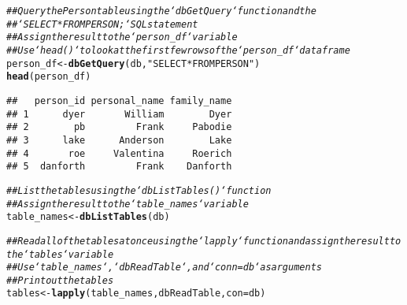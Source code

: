 \documentclass{article}\usepackage[]{graphicx}\usepackage[]{xcolor}
\makeatletter
\newcommand{\hlstr}[1]{\textcolor[rgb]{0.192,0.494,0.8}{#1}}%
\newcommand{\hlcom}[1]{\textcolor[rgb]{0.678,0.584,0.686}{\textit{#1}}}%
\newcommand{\hlstd}[1]{\textcolor[rgb]{0.345,0.345,0.345}{#1}}%
\newcommand{\hlkwb}[1]{\textcolor[rgb]{0.69,0.353,0.396}{#1}}%
\newcommand{\hlkwc}[1]{\textcolor[rgb]{0.333,0.667,0.333}{#1}}%
\newcommand{\hlkwd}[1]{\textcolor[rgb]{0.737,0.353,0.396}{\textbf{#1}}}%
\newenvironment{kframe}{%
 \def\at@end@of@kframe{}%
 \ifinner\ifhmode%
  \def\at@end@of@kframe{\end{minipage}}%
  \begin{minipage}{\columnwidth}%
 \fi\fi%
 \def\FrameCommand##1{\hskip\@totalleftmargin \hskip-\fboxsep
 \colorbox{shadecolor}{##1}\hskip-\fboxsep
     \hskip-\linewidth \hskip-\@totalleftmargin \hskip\columnwidth}%
 \MakeFramed {\advance\hsize-\width
   \@totalleftmargin\z@ \linewidth\hsize
   \@setminipage}}%
 {\par\unskip\endMakeFramed%
 \at@end@of@kframe}
\newenvironment{knitrout}{}{} %
\makeatother
\begin{document}
\begin{knitrout}
\begin{kframe}
\begin{alltt}
\hlcom{## Query the Person table using the `dbGetQuery` function and the}
\hlcom{## `SELECT * FROM PERSON;` SQL statement}
\hlcom{## Assign the result to the `person_df` variable}
\hlcom{## Use `head()` to look at the first few rows of the `person_df` dataframe}
\hlstd{person_df} \hlkwb{<-} \hlkwd{dbGetQuery}\hlstd{(db,} \hlstr{"SELECT * FROM PERSON"}\hlstd{)}
\hlkwd{head}\hlstd{(person_df)}
\end{alltt}
\begin{verbatim}
##   person_id personal_name family_name
## 1      dyer       William        Dyer
## 2        pb         Frank     Pabodie
## 3      lake      Anderson        Lake
## 4       roe     Valentina     Roerich
## 5  danforth         Frank    Danforth
\end{verbatim}
\begin{alltt}
\hlcom{## List the tables using the `dbListTables()` function}
\hlcom{## Assign the result to the `table_names` variable}
\hlstd{table_names} \hlkwb{<-} \hlkwd{dbListTables}\hlstd{(db)}

\hlcom{## Read all of the tables at once using the `lapply` function and assign the result to the `tables` variable}
\hlcom{## Use `table_names`, `dbReadTable`, and `conn = db` as arguments}
\hlcom{## Print out the tables}
\hlstd{tables} \hlkwb{<-} \hlkwd{lapply}\hlstd{(table_names, dbReadTable,} \hlkwc{con} \hlstd{= db)}
\end{alltt}



\end{kframe}
\end{knitrout}
\end{document}
